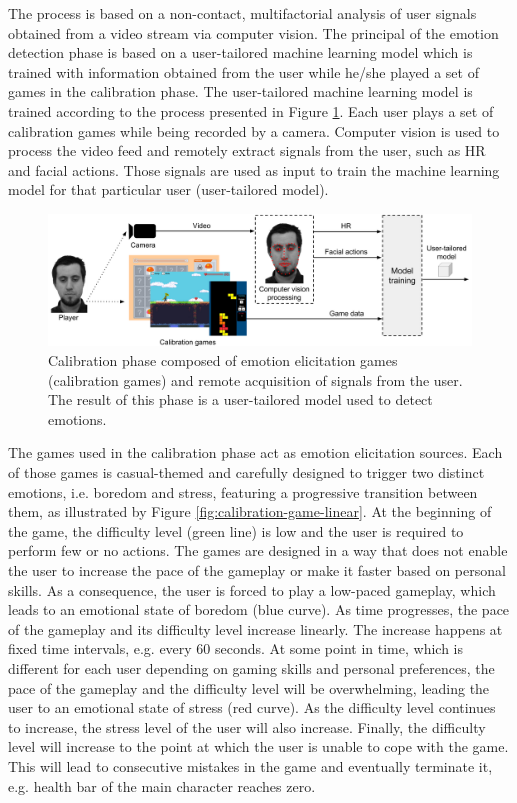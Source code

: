 The process is based on a non-contact, multifactorial analysis of user signals obtained from a video stream via computer vision. The principal of the emotion detection phase is based on a user-tailored machine learning model which is trained with information obtained from the user while he/she played a set of games in the calibration phase. The user-tailored machine learning model is trained according to the process presented in Figure \ref{fig:user-tailored-calibration}. Each user plays a set of calibration games while being recorded by a camera. Computer vision is used to process the video feed and remotely extract signals from the user, such as HR and facial actions. Those signals are used as input to train the machine learning model for that particular user (user-tailored model).

\begin{figure}[h]
    \centering
    \includegraphics[width=\textwidth]{Content/figures/user-tailored-calibration}
    \caption{Calibration phase composed of emotion elicitation games (calibration games) and remote acquisition of signals from the user. The result of this phase is a user-tailored model used to detect emotions.}
    \label{fig:user-tailored-calibration}
\end{figure}

The games used in the calibration phase act as emotion elicitation sources. Each of those games is casual-themed and carefully designed to trigger two distinct emotions, i.e. boredom and stress, featuring a progressive transition between them, as illustrated by Figure \ref{fig:calibration-game-linear}. At the beginning of the game, the difficulty level (green line) is low and the user is required to perform few or no actions. The games are designed in a way that does not enable the user to increase the pace of the gameplay or make it faster based on personal skills. As a consequence, the user is forced to play a low-paced gameplay, which leads to an emotional state of boredom (blue curve). As time progresses, the pace of the gameplay and its difficulty level increase linearly. The increase happens at fixed time intervals, e.g. every 60 seconds. At some point in time, which is different for each user depending on gaming skills and personal preferences, the pace of the gameplay and the difficulty level will be overwhelming, leading the user to an emotional state of stress (red curve). As the difficulty level continues to increase, the stress level of the user will also increase. Finally, the difficulty level will increase to the point at which the user is unable to cope with the game. This will lead to consecutive mistakes in the game and eventually terminate it, e.g. health bar of the main character reaches zero.

